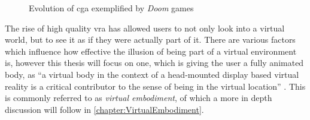 \begin{figure}[h]%
  \centering
  \hfill
  \caption{Evolution of \gls{cga} exemplified by \textit{Doom} games}
  \label{fig:doom1993vs2016}
\end{figure}

The rise of high quality \gls{vra} has allowed users to not only look into a virtual world, but to see it as if they were actually part of it. There are various factors which influence how effective the illusion of being part of a virtual environment is, however this thesis will focus on one, which is giving the user a fully animated body, as \enquote{a virtual body in the context of a head-mounted display based virtual reality is a critical contributor to the sense of being in the virtual location} \autocite[p.~374]{senseEmbodimentVR}. This is commonly referred to as \textit{virtual embodiment}, of which a more in depth discussion will follow in \autoref{chapter:VirtualEmbodiment}.
\newline

